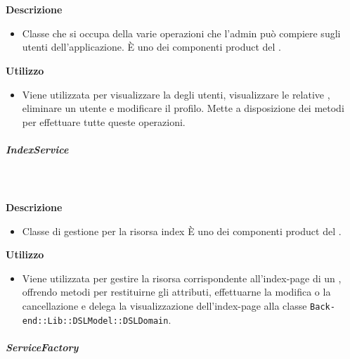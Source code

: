 				\textbf{\\ \\ Descrizione} 
					\begin{itemize}
						\item[] Classe che si occupa della varie operazioni che l'admin può compiere sugli utenti dell'applicazione. È uno dei componenti product del  .
					\end{itemize}      
				\textbf{Utilizzo}  
					\begin{itemize}
						\item[] Viene utilizzata per visualizzare la  degli utenti, visualizzare le relative , eliminare un utente e modificare il profilo. Mette a disposizione dei metodi per effettuare tutte queste operazioni.
					\end{itemize}
			\subparagraph{IndexService}
				
				\textbf{\\ \\ Descrizione} 
					\begin{itemize}
						\item[] Classe di gestione per la risorsa index 
È uno dei componenti product del  .

					\end{itemize}      
				\textbf{Utilizzo}  
					\begin{itemize}
						\item[] Viene utilizzata per gestire la risorsa corrispondente all'index-page di un , offrendo metodi per restituirne gli attributi, effettuarne la modifica o la cancellazione e delega la visualizzazione dell'index-page alla classe \texttt{Back-end::Lib::DSLModel::DSLDomain}.

					\end{itemize}
			\subparagraph{ServiceFactory}
				
